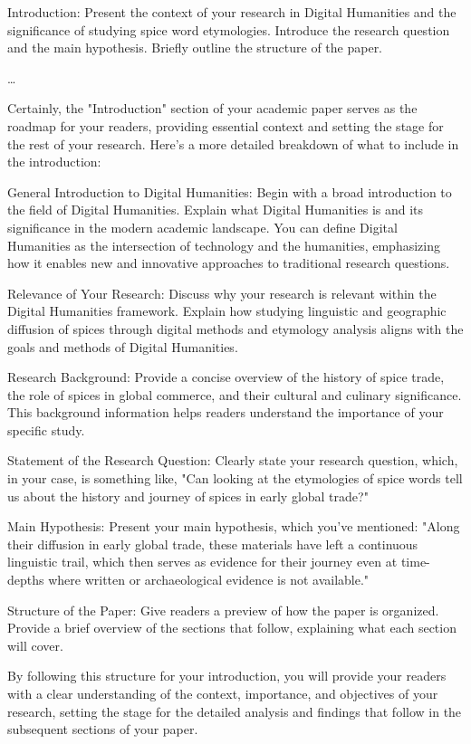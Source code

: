 \documentclass{dsh} %
\begin{document}
Introduction:
Present the context of your research in Digital Humanities and the significance of studying spice word etymologies.
Introduce the research question and the main hypothesis.
Briefly outline the structure of the paper.

\dots

Certainly, the "Introduction" section of your academic paper serves as the roadmap for your readers, providing essential context and setting the stage for the rest of your research. Here's a more detailed breakdown of what to include in the introduction:

    General Introduction to Digital Humanities:
        Begin with a broad introduction to the field of Digital Humanities. Explain what Digital Humanities is and its significance in the modern academic landscape. You can define Digital Humanities as the intersection of technology and the humanities, emphasizing how it enables new and innovative approaches to traditional research questions.

    Relevance of Your Research:
        Discuss why your research is relevant within the Digital Humanities framework. Explain how studying linguistic and geographic diffusion of spices through digital methods and etymology analysis aligns with the goals and methods of Digital Humanities.

    Research Background:
        Provide a concise overview of the history of spice trade, the role of spices in global commerce, and their cultural and culinary significance. This background information helps readers understand the importance of your specific study.

    Statement of the Research Question:
        Clearly state your research question, which, in your case, is something like, "Can looking at the etymologies of spice words tell us about the history and journey of spices in early global trade?"

    Main Hypothesis:
        Present your main hypothesis, which you've mentioned: "Along their diffusion in early global trade, these materials have left a continuous linguistic trail, which then serves as evidence for their journey even at time-depths where written or archaeological evidence is not available."

    Structure of the Paper:
        Give readers a preview of how the paper is organized. Provide a brief overview of the sections that follow, explaining what each section will cover.

By following this structure for your introduction, you will provide your readers with a clear understanding of the context, importance, and objectives of your research, setting the stage for the detailed analysis and findings that follow in the subsequent sections of your paper.
\end{document}
